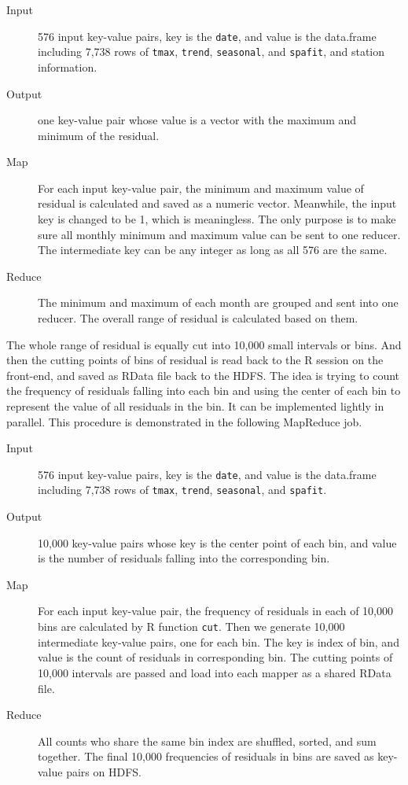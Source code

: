 \begin{description}
  \item[Input] 576 input key-value pairs, key is the \texttt{date}, and value is 
  the data.frame including 7,738 rows of \texttt{tmax}, \texttt{trend}, 
  \texttt{seasonal}, and \texttt{spafit}, and station information.
  \item[Output] one key-value pair whose value is a vector with the maximum and
  minimum of the residual.
  \item[Map] For each input key-value pair, the minimum and maximum value of 
  residual is calculated and saved as a numeric vector. Meanwhile, the input
  key is changed to be 1, which is meaningless. The only purpose is to make sure
  all monthly minimum and maximum value can be sent to one reducer. The 
  intermediate key can be any integer as long as all 576 are the same.
  \item[Reduce] The minimum and maximum of each month are grouped and sent into
  one reducer. The overall range of residual is calculated based on them.
\end{description}

The whole range of residual is equally cut into 10,000 small intervals 
or bins. And then the cutting points of bins of residual is read back to the R 
session on the front-end, and saved as RData file back to the HDFS.
The idea is trying to count the frequency of residuals falling into each
bin and using the center of each bin to represent the value of all residuals in
the bin. It can be implemented lightly in parallel. This procedure is 
demonstrated in the following MapReduce job.

\begin{description}
  \item[Input] 576 input key-value pairs, key is the \texttt{date}, and value is 
  the data.frame including 7,738 rows of \texttt{tmax}, \texttt{trend}, 
  \texttt{seasonal}, and \texttt{spafit}.
  \item[Output] 10,000 key-value pairs whose key is the center point of each 
  bin, and value is the number of residuals falling into the corresponding bin.
  \item[Map] For each input key-value pair, the frequency of residuals in each
  of 10,000 bins are calculated by R function \texttt{cut}. Then we generate
  10,000 intermediate key-value pairs, one for each bin. The key is index of bin,
  and value is the count of residuals in corresponding bin. The cutting points
  of 10,000 intervals are passed and load into each mapper as a shared RData file.
  \item[Reduce] All counts who share the same bin index are shuffled, sorted, and
  sum together. The final 10,000 frequencies of residuals in bins are saved as
  key-value pairs on HDFS.
\end{description}

